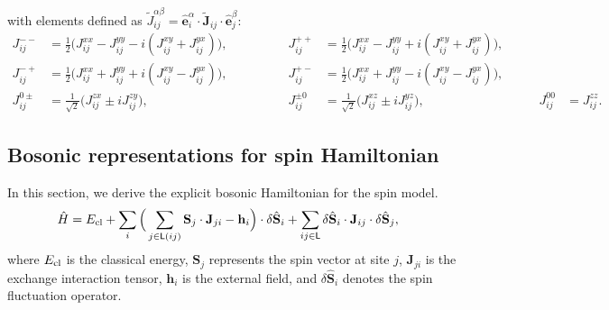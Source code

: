 \documentclass[aps, prx, nofootinbib, superscriptaddress]{revtex4-2}
\begin{document}
with elements defined as $\widetilde{J}_{ij}^{\alpha\beta} = \hat{\mathbf{e}}_i^{\alpha} \cdot \widetilde{\mathbf{J}}_{ij} \cdot \hat{\mathbf{e}}_j^{\beta}$:
\begin{equation}\label{eq: expressions for exchange couplings}
    \begin{array}{rlrlrl}
        J_{ij}^{--} &= \frac{1}{2} \big( J_{ij}^{xx} - J_{ij}^{yy} - i (J_{ij}^{xy} + J_{ij}^{yx}) \big), \qquad \qquad &
        J_{ij}^{++} &= \frac{1}{2} \big( J_{ij}^{xx} - J_{ij}^{yy} + i (J_{ij}^{xy} + J_{ij}^{yx}) \big), &&\\[0.25em]
        J_{ij}^{-+} &= \frac{1}{2} \big( J_{ij}^{xx} + J_{ij}^{yy} + i (J_{ij}^{xy} - J_{ij}^{yx}) \big), \qquad &
        J_{ij}^{+-} &= \frac{1}{2} \big( J_{ij}^{xx} + J_{ij}^{yy} - i (J_{ij}^{xy} - J_{ij}^{yx}) \big), &&\\[0.25em]
        J_{ij}^{0\pm} &= \frac{1}{\sqrt{2}} \big( J_{ij}^{zx} \pm i J_{ij}^{zy} \big), &
        J_{ij}^{\pm0} &= \frac{1}{\sqrt{2}} \big( J_{ij}^{xz} \pm i J_{ij}^{yz} \big), & \qquad
        J_{ij}^{00} &= J_{ij}^{zz}.
    \end{array}
\end{equation}





\subsection{Bosonic representations for spin Hamiltonian}\label{subsec: Bosonic representations for spin exchange Hamiltonian}

In this section, we derive the explicit bosonic Hamiltonian for the spin model.
\begin{equation}
    \begin{split}
        \hat{H} 
        &= E_{\rm cl}
        + \sum_{i} \Big( \sum_{j \in \mathsf{L}(ij)} \mathbf{S}_{j} \cdot \mathbf{J}_{ji} - \mathbf{h}_{i} \Big) \cdot \delta \hat{\mathbf{S}}_{i}
        + \sum_{ij \in \mathsf{L}} \delta \hat{\mathbf{S}}_{i} \cdot \mathbf{J}_{ij} \cdot \delta \hat{\mathbf{S}}_{j},
    \end{split}
\end{equation}
where $E_{\rm cl}$ is the classical energy, $\mathbf{S}_{j}$ represents the spin vector at site $j$, $\mathbf{J}_{ji}$ is the exchange interaction tensor, $\mathbf{h}_{i}$ is the external field, and $\delta \hat{\mathbf{S}}_{i}$ denotes the spin fluctuation operator.
\end{document}
